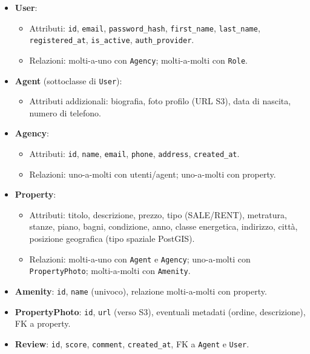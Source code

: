 \documentclass[a4paper,11pt]{report}
\begin{document}
\begin{itemize}[nosep]
  \item \textbf{User}:
    \begin{itemize}[nosep]
      \item Attributi: \texttt{id}, \texttt{email}, \texttt{password\_hash}, \texttt{first\_name}, \texttt{last\_name}, \texttt{registered\_at}, \texttt{is\_active}, \texttt{auth\_provider}.
      \item Relazioni: molti-a-uno con \texttt{Agency}; molti-a-molti con \texttt{Role}.
    \end{itemize}
  \item \textbf{Agent} (sottoclasse di \texttt{User}):
    \begin{itemize}[nosep]
      \item Attributi addizionali: biografia, foto profilo (URL S3), data di nascita, numero di telefono.
    \end{itemize}
  \item \textbf{Agency}:
    \begin{itemize}[nosep]
      \item Attributi: \texttt{id}, \texttt{name}, \texttt{email}, \texttt{phone}, \texttt{address}, \texttt{created\_at}.
      \item Relazioni: uno-a-molti con utenti/agent; uno-a-molti con property.
    \end{itemize}
  \item \textbf{Property}:
    \begin{itemize}[nosep]
      \item Attributi: titolo, descrizione, prezzo, tipo (SALE/RENT), metratura, stanze, piano, bagni, condizione, anno, classe energetica, indirizzo, città, posizione geografica (tipo spaziale PostGIS).
      \item Relazioni: molti-a-uno con \texttt{Agent} e \texttt{Agency}; uno-a-molti con \texttt{PropertyPhoto}; molti-a-molti con \texttt{Amenity}.
    \end{itemize}
  \item \textbf{Amenity}: \texttt{id}, \texttt{name} (univoco), relazione molti-a-molti con property.
  \item \textbf{PropertyPhoto}: \texttt{id}, \texttt{url} (verso S3), eventuali metadati (ordine, descrizione), FK a property.
  \item \textbf{Review}: \texttt{id}, \texttt{score}, \texttt{comment}, \texttt{created\_at}, FK a \texttt{Agent} e \texttt{User}.
\end{itemize}
\end{document}
